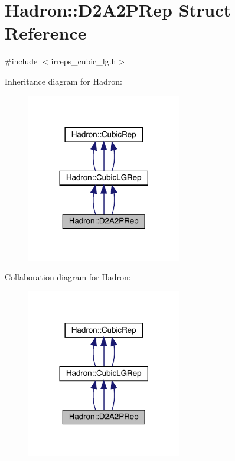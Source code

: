\hypertarget{structHadron_1_1D2A2PRep}{}\section{Hadron\+:\+:D2\+A2\+P\+Rep Struct Reference}
\label{structHadron_1_1D2A2PRep}


{\ttfamily \#include $<$irreps\+\_\+cubic\+\_\+lg.\+h$>$}



Inheritance diagram for Hadron\+:
\nopagebreak
\begin{figure}[H]
\begin{center}
\leavevmode
\includegraphics[width=192pt]{d0/d99/structHadron_1_1D2A2PRep__inherit__graph}
\end{center}
\end{figure}


Collaboration diagram for Hadron\+:
\nopagebreak
\begin{figure}[H]
\begin{center}
\leavevmode
\includegraphics[width=192pt]{de/d1c/structHadron_1_1D2A2PRep__coll__graph}
\end{center}
\end{figure}
